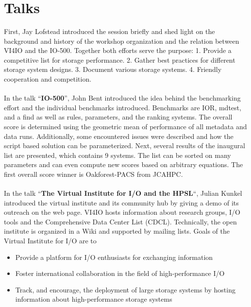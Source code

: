 \documentclass{llncs}
\begin{document}
\section{Talks}

\paragraph{}
First, Jay Lofstead introduced the session briefly and shed light on the background and
history of the workshop organization and the relation between VI4IO and the IO-500.
Together both efforts serve the purpose:
1. Provide a competitive list for storage performance.
2. Gather best practices for different storage system designs.
3. Document various storage systems.
4. Friendly cooperation and competition.



\paragraph{}
In the talk “\textbf{IO-500}”, John Bent introduced the idea behind the benchmarking effort and the individual benchmarks introduced.
Benchmarks are IOR, mdtest, and a find as well as  rules, parameters, and the ranking systems.
The overall score is determined using the geometric mean of performance of all metadata and data runs.
Additionally, some encountered issues were described and how the script based solution can be parameterized.
Next, several results of the inaugural list are presented, which contains 9 systems.
The list can be sorted on many parameters and can even compute new scores based on arbitrary equations.
The first overall score winner is Oakforest-PACS from JCAHPC.


\paragraph{}
In the talk “\textbf{The Virtual Institute for I/O and the HPSL}“, Julian Kunkel introduced the virtual institute and its community hub by giving a demo of its outreach on the web page. VI4IO hosts information about research groups, I/O tools and the Comprehensive Data Center List (CDCL).
Technically, the open institute is organized in a Wiki and supported by mailing lists.
Goals of the Virtual Institute for I/O are to
\begin{itemize}
	\item Provide a platform for I/O enthusiasts for exchanging information
	\item Foster international collaboration in the field of high-performance I/O
	\item Track, and encourage, the deployment of large storage systems by hosting information about high-performance storage systems
\end{itemize}
\end{document}
